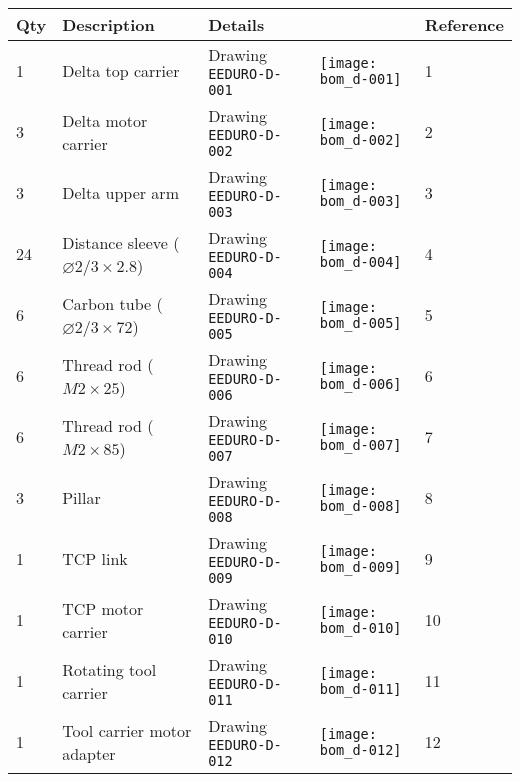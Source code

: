 \begin{tabular}{m{0.5cm} m{5cm} m{5cm} m{1cm} m{1.5cm}}
\bfseries Qty & \bfseries Description               & \bfseries Details                &                                                   & \bfseries Reference \\
\hline
1    & Delta top carrier                            & Drawing \texttt{EEDURO-D-001}    & \texttt{[image: bom\_d-001]}           & 1    \\
\hline
3    & Delta motor carrier                          & Drawing \texttt{EEDURO-D-002}    & \texttt{[image: bom\_d-002]}           & 2    \\
\hline
3    & Delta upper arm                              & Drawing \texttt{EEDURO-D-003}    & \texttt{[image: bom\_d-003]}           & 3    \\
\hline
24   & Distance sleeve ($\varnothing 2/3\times2.8$) & Drawing \texttt{EEDURO-D-004}    & \texttt{[image: bom\_d-004]}           & 4    \\
\hline
6    & Carbon tube ($\varnothing 2/3\times72$)      & Drawing \texttt{EEDURO-D-005}    & \texttt{[image: bom\_d-005]}           & 5    \\
\hline
6    & Thread rod ($M2\times25$)                    & Drawing \texttt{EEDURO-D-006}    & \texttt{[image: bom\_d-006]}           & 6    \\
\hline
6    & Thread rod ($M2\times85$)                    & Drawing \texttt{EEDURO-D-007}    & \texttt{[image: bom\_d-007]}           & 7    \\
\hline
3    & Pillar                                       & Drawing \texttt{EEDURO-D-008}    & \texttt{[image: bom\_d-008]}           & 8    \\
\hline
1    & TCP link                                     & Drawing \texttt{EEDURO-D-009}    & \texttt{[image: bom\_d-009]}           & 9    \\
\hline
1    & TCP motor carrier                            & Drawing \texttt{EEDURO-D-010}    & \texttt{[image: bom\_d-010]}           & 10    \\
\hline
1    & Rotating tool carrier                        & Drawing \texttt{EEDURO-D-011}    & \texttt{[image: bom\_d-011]}           & 11    \\
\hline
1    & Tool carrier motor adapter                   & Drawing \texttt{EEDURO-D-012}    & \texttt{[image: bom\_d-012]}           & 12    \\

\end{tabular}
